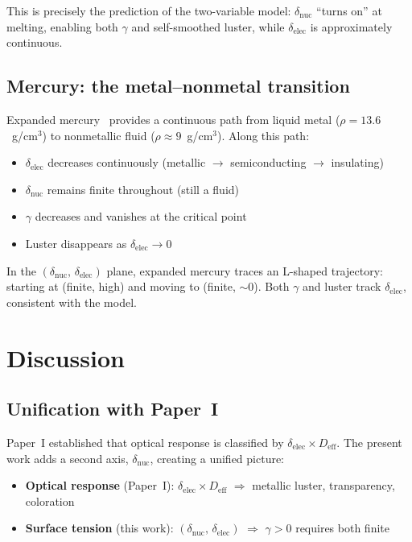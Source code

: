 \documentclass[twocolumn,showpacs,preprintnumbers,amsmath,amssymb,prb]{revtex4-2}
\begin{document}
This is precisely the prediction of the two-variable model:
$\delta_\mathrm{nuc}$ ``turns on'' at melting, enabling both
$\gamma$ and self-smoothed luster, while $\delta_\mathrm{elec}$
is approximately continuous.

\subsection{Mercury: the metal--nonmetal transition}

Expanded mercury~\cite{Hensel1995} provides a continuous
path from liquid metal ($\rho = 13.6$~g/cm$^3$) to
nonmetallic fluid ($\rho \approx 9$~g/cm$^3$).
Along this path:
\begin{itemize}
  \item $\delta_\mathrm{elec}$ decreases continuously
    (metallic $\to$ semiconducting $\to$ insulating)
  \item $\delta_\mathrm{nuc}$ remains finite throughout
    (still a fluid)
  \item $\gamma$ decreases and vanishes at the critical point
  \item Luster disappears as $\delta_\mathrm{elec} \to 0$
\end{itemize}

In the $(\delta_\mathrm{nuc},\,\delta_\mathrm{elec})$ plane,
expanded mercury traces an L-shaped trajectory:
starting at (finite, high) and moving to (finite, $\sim 0$).
Both $\gamma$ and luster track $\delta_\mathrm{elec}$,
consistent with the model.


\section{Discussion}
\label{sec:discussion}

\subsection{Unification with Paper~I}

Paper~I established that optical response is classified by
$\delta_\mathrm{elec} \times D_\mathrm{eff}$.
The present work adds a second axis, $\delta_\mathrm{nuc}$,
creating a unified picture:

\begin{itemize}
  \item \textbf{Optical response} (Paper~I):
    $\delta_\mathrm{elec} \times D_\mathrm{eff}$
    $\Rightarrow$ metallic luster, transparency, coloration
  \item \textbf{Surface tension} (this work):
    $(\delta_\mathrm{nuc},\,\delta_\mathrm{elec})$
    $\Rightarrow$ $\gamma > 0$ requires both finite
\end{itemize}
\end{document}
